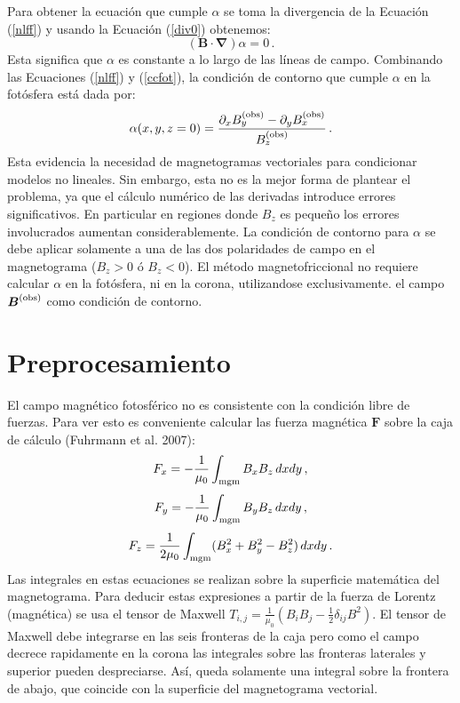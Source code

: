 \documentclass[a4paper,10pt]{article}
\def\bforce{{\boldsymbol{F}}}
\def\bB{{\boldsymbol{B}}}
\def\grad{\boldsymbol{\nabla}}
\def\bxobs{B_x^{\rm (obs)}}
\def\byobs{B_y^{\rm (obs)}}
\def\bzobs{B_z^{\rm (obs)}}
\def\bBobs{{\boldsymbol{B}}^{\rm (obs)}}
\def\eq#1{Ecuación (\ref{#1})}
\def\eqs#1#2{Ecuaciones (\ref{#1}) y (\ref{#2})}
\begin{document}
Para obtener la ecuación que cumple $\alpha$ se toma la divergencia de la \eq{nlff} y usando la \eq{div0} obtenemos:
\begin{equation}
( \bB \cdot \grad) \alpha = 0 \,.
\end{equation}
Esta significa que $\alpha$ es constante a lo largo de las líneas de campo. Combinando las \eqs{nlff}{ccfot}, la condición de contorno que cumple $\alpha$ en la fotósfera está dada por:
\begin{equation}
 \alpha (x,y,z=0) = \frac{\partial_x{\byobs}-\partial_y{\bxobs}}{\bzobs}\,.
\end{equation}
Esta evidencia la necesidad de magnetogramas vectoriales para condicionar modelos no lineales. Sin embargo, esta no es la mejor forma de plantear el problema, ya que el cálculo numérico de las derivadas introduce errores significativos. En particular en regiones donde $B_z$ es pequeño los errores involucrados aumentan considerablemente. La condición de contorno para $\alpha$ se debe aplicar solamente a una de las dos polaridades de campo en el magnetograma ($B_z>0$ ó $B_z<0$). El método magnetofriccional no requiere calcular $\alpha$ en la fotósfera, ni en la corona, utilizandose exclusivamente. el campo $\bBobs$ como condición de contorno. 


\section{Preprocesamiento}

El campo magnético fotosférico no es consistente con la condición libre de fuerzas. Para ver esto es conveniente calcular las fuerza magnética $\bforce$ sobre la caja de cálculo (Fuhrmann et al. 2007):
\begin{equation}
 F_x = -\frac{1}{\mu_0}\int_{\rm mgm} B_xB_z \,dx dy \,,
\end{equation}
\begin{equation}
 F_y = -\frac{1}{\mu_0}\int_{\rm mgm} B_yB_z \,dx dy \,,
\end{equation}
\begin{equation}
 F_z = \frac{1}{2\mu_0}\int_{\rm mgm}(B_x^2 + B_y^2 - B_z^2) \,dx dy \,.
\end{equation}
Las integrales en estas ecuaciones se realizan sobre la superficie matemática del magnetograma. Para deducir estas expresiones a partir de la fuerza de Lorentz (magnética) se usa el tensor de Maxwell $T_{i,j}=\frac{1}{\mu_0}\left(B_iB_j - \frac{1}{2}\delta_{ij}B^2 \right)$. El tensor de Maxwell debe integrarse en las seis fronteras de la caja pero como el campo decrece rapidamente en la corona las integrales sobre las fronteras laterales y superior pueden despreciarse. Así, queda solamente una integral sobre la frontera de abajo, que coincide con la superficie del magnetograma vectorial.
\end{document}
